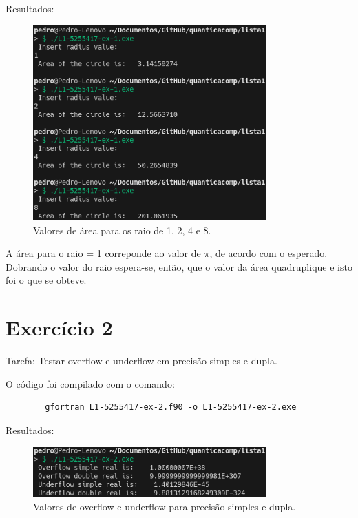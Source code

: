 \documentclass[12pt, a4paper]{article} %
\begin{document}
    Resultados:
    \begin{figure}[H]
        \centering
        \includegraphics[width=0.8\textwidth]{../images/results-ex1.png}
        \caption{Valores de \'area para os raio de 1, 2, 4 e 8.}
    \end{figure}

    A \'area para o raio = 1 correponde ao valor de $\pi$, de acordo com o esperado. Dobrando o valor do raio espera-se, então, que o valor da \'area quadruplique e isto foi o que se obteve.

\section{Exerc\'icio 2}

    Tarefa: Testar overflow e underflow em precis\~ao simples e dupla.


    O c\'odigo foi compilado com o comando:
    \begin{verbatim}
        gfortran L1-5255417-ex-2.f90 -o L1-5255417-ex-2.exe
    \end{verbatim}

    Resultados:
    \begin{figure}[H]
        \centering
        \includegraphics[width=0.8\textwidth]{../images/results-ex2.png}
        \caption{Valores de overflow e underflow para precis\~ao simples e dupla.}
    \end{figure}
\end{document}
